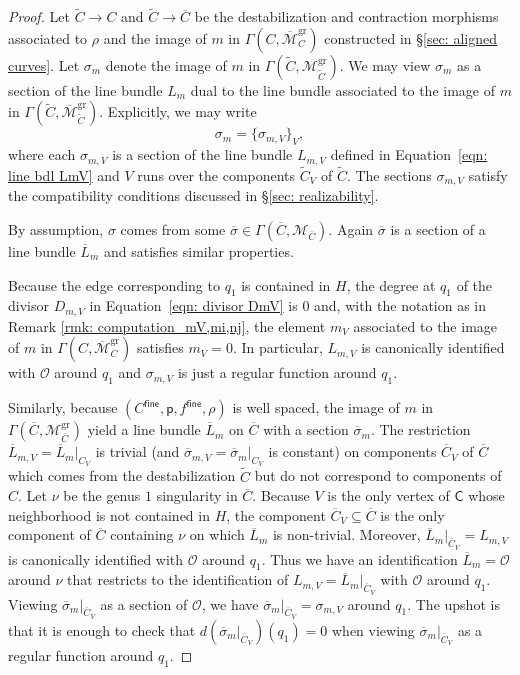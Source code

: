 \documentclass{article}
\def\cM{{\overline{\mathcal{M}}}}
\def\cO{\mathcal{O}}
\def\oM{\overline{\mathcal{M}}}
\def\cM{{\mathcal{M}}}
\newcommand{\tropC}{\mathsf{C}}
\newcommand{\gr}{\mathrm{gr}}
\begin{document}
\begin{proof}
    
    Let $\widetilde{C} \to C$ and $\widetilde{C} \to \overline{C}$ be the destabilization and contraction morphisms associated to $\rho$ and the image of $m$ in $\Gamma(C,\oM_C^{\gr})$ constructed in \S\ref{sec: aligned curves}. Let $\sigma_m$ denote the image of $m$ in $\Gamma(\widetilde{C},\mathcal{M}_{\widetilde{C}}^{\gr})$. We may view $\sigma_m$ as a section of the line bundle $L_m$ dual to the line bundle associated to the image of $m$ in $\Gamma(\widetilde{C},\overline{\mathcal{M}}_{\widetilde{C}}^{\gr})$. Explicitly, we may write
\[
\sigma_m=\{\sigma_{m,V}\}_{V},
\]
where each $\sigma_{m,V}$ is a section of the line bundle $L_{m,V}$ defined in Equation~\eqref{eqn: line bdl LmV} and $V$ runs over the components $\widetilde{C}_V$ of $\widetilde{C}$. The sections $\sigma_{m,V}$ satisfy the compatibility conditions discussed in \S\ref{sec: realizability}.


By assumption, $\sigma$ comes from some $\overline{\sigma} \in \Gamma(\overline{C},\cM_{\overline{C}})$. Again $\overline{\sigma}$ is a section of a line bundle $\overline{L}_m$ and satisfies similar properties.

Because the edge corresponding to $q_1$ is contained in $H$, the degree at $q_1$ of the divisor $D_{m,V}$ in Equation~\eqref{eqn: divisor DmV} is $0$ and, with the notation as in Remark \ref{rmk: computation_mV,mi,nj}, the element $m_V$ associated to the image of $m$ in $\Gamma(C,\oM_{C}^{\gr})$ satisfies $m_V=0$. In particular, $L_{m,V}$ is canonically identified with $\cO$ around $q_1$ and $\sigma_{m,V}$ is just a regular function around $q_1$. 

Similarly, because  $(C^{\mathsf{fine}}, \mathsf{p}, f^{\mathsf{fine}}, \rho)$ is well spaced, the image of $m$ in $\Gamma(\overline{C}, \cM_{\overline{C}}^{\mathrm{gr}})$ yield a line bundle $\overline{L}_m$ on $\overline{C}$ with a section $\overline{\sigma}_m$. The restriction  $\overline{L}_{m,V}= \overline{L}_m|_{C_V}$ is trivial (and $\overline{\sigma}_{m,V}=\overline{\sigma}_{m}|_{C_V}$ is constant) on components $\overline{C}_V$ of $\overline{C}$ which comes from the destabilization $\widetilde{C}$ but do not correspond to components of $C$. Let $\nu$ be the genus $1$ singularity in $\overline{C}$. Because $V$ is the only vertex of $\tropC$ whose neighborhood is not contained in $H$, the component $\overline{C}_V \subseteq \overline{C}$ is the only component of $\overline{C}$ containing $\nu$ on which $\overline{L}_m$ is non-trivial. Moreover, $\overline{L}_m|_{\overline{C}_V} = L_{m,V}$ is canonically identified with $\cO$ around $q_1$. Thus we have an identification $\overline{L}_m = \cO$ around $\nu$ that restricts to the identification of $L_{m,V}=\overline{L}_m|_{\overline{C}_V}$ with $\cO$ around $q_1$. Viewing $\overline{\sigma}_m|_{\overline{C}_V}$ as a section of $\cO$, we have $\overline{\sigma}_m|_{\overline{C}_V}=\sigma_{m,V}$ around $q_1$. The upshot is that it is enough to check that $d(\overline{\sigma}_m|_{\overline{C}_V})(q_1)=0$ when viewing $\overline{\sigma}_m|_{\overline{C}_V}$ as a regular function around $q_1$. 


\end{proof}
\end{document}
